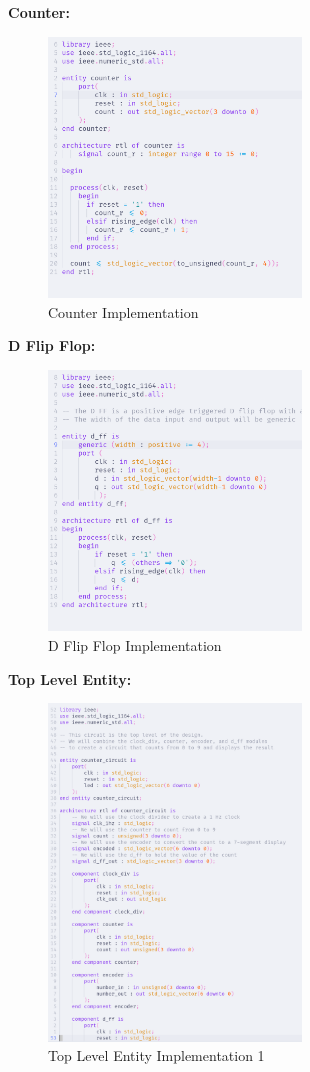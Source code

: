 \documentclass{article}
\begin{document}
\textbf{Counter:} \\
\begin{figure}[H]
  \centering
  \includegraphics[width=0.6\textwidth]{counter.png}
  \caption{Counter Implementation}
\end{figure}
\textbf{D Flip Flop:} \\
\begin{figure}[H]
  \centering
  \includegraphics[width=0.6\textwidth]{dff.png}
  \caption{D Flip Flop Implementation}
\end{figure}
\textbf{Top Level Entity:} \\
\begin{figure}[H]
  \centering
  \includegraphics[width=0.6\textwidth]{cc1.png}
  \caption{Top Level Entity Implementation 1}
\end{figure}
\end{document}
